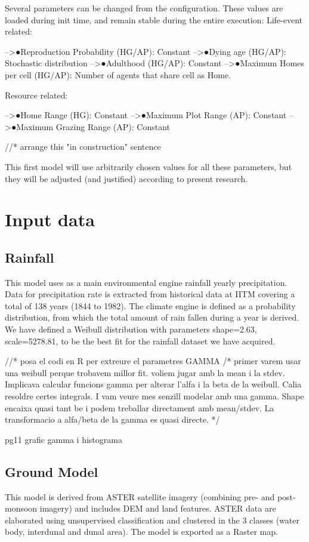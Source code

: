 \begin{enumerate}
\begin{enumerate}
\begin{enumeration}
\begin{enumerate}
\begin{enumerate}
\begin{enumerate}
\begin{enumerate}
Several parameters can be changed from the configuration. These values are loaded during init time,
and remain stable during the entire execution:
Life-event related:
\begin{enumerate}
-->●Reproduction Probability (HG/AP): Constant
-->●Dying age (HG/AP): Stochastic distribution
-->●Adulthood (HG/AP): Constant
-->●Maximum Homes per cell (HG/AP): Number of agents that share cell as Home.
\end{enumerate}

Resource related:
\begin{enumerate}
-->●Home Range (HG): Constant
-->●Maximum Plot Range (AP): Constant
-->●Maximum Grazing Range (AP): Constant
\end{enumerate}

//* arrange this "in construction" sentence

This first model will use arbitrarily chosen values for all these parameters, but they will be adjusted
(and justified) according to present research.

\section{Input data}

\subsection{Rainfall}
This model uses as a main environmental engine rainfall yearly precipitation. Data for precipitation
rate is extracted from historical data at IITM covering a total of 138 years (1844 to 1982). The climate
engine is defined as a probability distribution, from which the total amount of rain fallen during a year
is derived. We have defined a Weibull distribution with parameters shape=2.63, scale=5278.81, to be
the best fit for the rainfall dataset we have acquired.

//* posa el codi en R per extreure el parametres GAMMA
/*
primer varem usar una weibull perque trobavem millor fit.
voliem jugar amb la mean i la stdev. Implicava calcular funcions gamma per alterar
l'alfa i la beta de la weibull. Calia resoldre certes integrals. I vam veure mes senzill
modelar amb una gamma. Shape encaixa quasi tant be i podem treballar directament
amb mean/stdev. La transformacio a alfa/beta de la gamma es quasi directe.
*/

pg11 grafic gamma i histograma


\subsection{Ground Model}
This model is derived from ASTER satellite imagery (combining pre- and post-monsoon imagery) and
includes DEM and land features. ASTER data are elaborated using unsupervised classification and
clustered in the 3 classes (water body, interdunal and dunal area). The model is exported as a Raster
map.


\end{enumerate}
\end{enumerate}
\end{enumerate}
\end{enumerate}
\end{enumeration}
\end{enumerate}
\end{enumerate}
